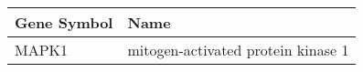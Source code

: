 \begin{tabular}{ll}
\toprule
Gene Symbol &                               Name \\
\midrule
      MAPK1 & mitogen-activated protein kinase 1 \\
\bottomrule
\end{tabular}
